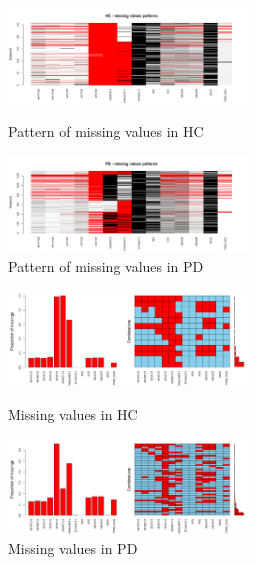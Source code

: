 \documentclass[]{article}
\begin{document}
\begin{figure}[h]
	\centering
	\parbox{2.8in}{
		\centering
		\includegraphics[width=2.5in]{../missing_patterns_hc}
		\caption{Pattern of missing values in HC}
		\label{fig:miss_patt_hc}}
	\begin{minipage}{2.8in}
		\centering
		\includegraphics[width=2.5in]{../missing_patterns_pd}
		\caption{Pattern of missing values in PD}
		\label{fig:miss_patt_pd}
	\end{minipage}
\end{figure}

\begin{figure}[h]
	\centering
	\parbox{2.8in}{
		\centering
		\includegraphics[width=2.5in]{../missing_values_hc}
		\caption{Missing values in HC}
		\label{fig:miss_val_hc}}
	\begin{minipage}{2.8in}
		\centering
		\includegraphics[width=2.5in]{../missing_values_pd}
		\caption{Missing values in PD}
		\label{fig:miss_val_pd}
	\end{minipage}
\end{figure}
\end{document}
